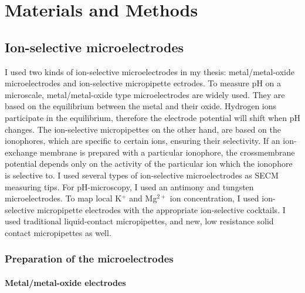 \chapter{Materials and Methods}
\section{Ion-selective microelectrodes}
I used two kinds of ion-selective microelectrodes in my thesis: metal/metal-oxide microelectrodes and ion-selective micropipette ectrodes.
To measure pH on a microscale, metal/metal-oxide type microelectrodes are widely used.
They are based on the equilibrium between the metal and their oxide.
Hydrogen ions participate in the equilibrium, therefore the electrode potential will shift when pH changes.
The ion-selective micropipettes on the other hand, are based on the ionophores, which are specific to certain ions, ensuring their selectivity.
If an ion-exchange membrane is prepared with a particular ionophore, the crossmembrane potential depends only on the activity of the particular ion which the ionophore is selective to.
I used several types of ion-selective microelectrodes as SECM measuring tips.
For pH-microscopy, I used an antimony and tungsten microelectrodes.
To map local K$^+$ and Mg$^{2+}$ ion concentration, I used ion-selective micropipette electrodes with the appropriate ion-selective cocktails.
I used traditional liquid-contact micropipettes, and new, low resistance solid contact micropipettes as well.
		\subsection{Preparation of the microelectrodes}
			\subsubsection{Metal/metal-oxide electrodes}
